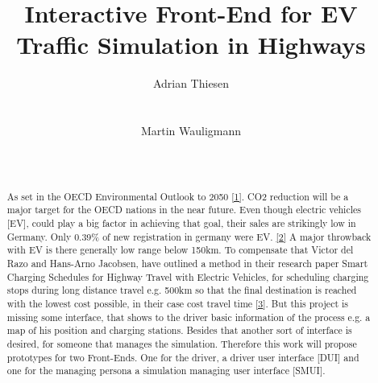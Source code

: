 \documentclass{sig-alternate}
\begin{document}
\title{Interactive Front-End for EV Traffic Simulation in Highways}



\author{
\alignauthor Adrian Thiesen\\
       \\
       \\
\alignauthor Martin Wauligmann\\
       \\
       \\
}


\maketitle


\begin{abstract}

As set in the OECD Environmental Outlook to 2050 \href{https://www.oecd.org/env/cc/49082173.pdf}{[1]}. CO2 reduction
will be a major target for the OECD nations in the near future. Even though electric vehicles [EV], could play a big
factor in achieving that goal, their sales are strikingly low in Germany. Only 0.39\% of new registration in germany
were EV. \href{http://www.kba.de/DE/Statistik/Fahrzeuge/Neuzulassungen/neuzulassungen_node.html}{[2]} A major
throwback with EV is there generally low range below 150km. To compensate that Victor del Razo and Hans-Arno
Jacobsen, have outlined a method in their research paper Smart Charging Schedules for Highway Travel with Electric
Vehicles, for scheduling charging stops during long distance travel e.g. 500km  so that the final destination is
reached with the lowest cost possible, in their case cost travel time \href{https://www.i13.in.tum
.de/fileadmin/w00bof/www/PDF/TTE_2016.pdf}{[3}]. But this project is missing some interface, that shows to the driver
basic information of the process e.g. a map of his position and charging stations. Besides that another sort of
interface is desired, for someone that manages the simulation. Therefore this work will propose prototypes
for two Front-Ends. One for the driver, a driver user interface [DUI] and one for the managing persona a simulation
managing user interface [SMUI].

\end{abstract}
\end{document}
